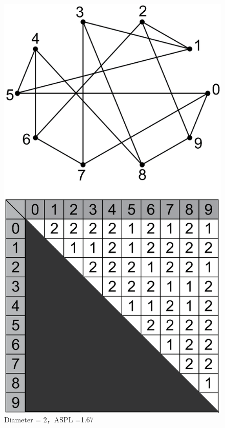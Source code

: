 \documentclass[graybox]{svmult}
\begin{document}
\begin{figure}[t]
 \begin{minipage}{0.5\hsize}
  \begin{center}
\includegraphics[scale=0.25,clip]{img/n10d3-opt.eps}
\caption{Diameter = 2，ASPL =1.67}\label{fig:example-opt}
  \end{center}
 \end{minipage}
\end{figure}
\end{document}
